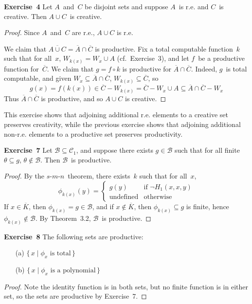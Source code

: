 \documentclass[letterpaper]{article}
\newcommand{\exercise}[2][]{\noindent\textbf{Exercise~{#2}}\ifthenelse{\isempty{#1}}{\textbf{.}}{ ({#1})\textbf{.}}}
\newcommand{\B}{\mathcal{B}}
\newcommand{\C}{\mathcal{C}}
\newcommand{\union}{\cup}
\newcommand{\sect}{\cap}
\newcommand{\smn}{$s$-$m$-$n$}
\theoremstyle{plain}
\theoremstyle{definition}
\theoremstyle{remark}
\begin{document}
\exercise{4}
Let $A$~and~$C$ be disjoint sets and suppose $A$~is r.e. and $C$~is creative. Then $A\union C$~is creative.
\begin{proof}
Since $A$~and~$C$ are r.e., $A\union C$ is r.e.

We claim that $\overline{A\union C}=\overline{A}\sect\overline{C}$ is productive. Fix a total computable function~$k$ such that for all~$x$, $W_{k(x)}=W_x\union A$ (cf.~Exercise~3), and let $f$~be a productive function for~$\overline{C}$. We claim that $g=f\circ k$ is productive for $\overline{A}\sect\overline{C}$. Indeed, $g$~is total computable, and given $W_x\subseteq\overline{A}\sect\overline{C}$, $W_{k(x)}\subseteq\overline{C}$, so
$$g(x)=f(k(x))\in\overline{C}-W_{k(x)}=\overline{C}-W_x\union A\subseteq\overline{A}\sect\overline{C}-W_x$$
Thus $\overline{A}\sect\overline{C}$ is productive, and so $A\union C$ is creative.
\end{proof}

\noindent This exercise shows that adjoining additional r.e. elements to a creative set preserves creativity, while the previous exercise shows that adjoining additional non-r.e. elements to a productive set preserves productivity.

\bigskip
\exercise{7}
Let $\B\subseteq\C_1$, and suppose there exists $g\in\B$ such that for all finite $\theta\subseteq g$, $\theta\not\in\B$. Then $\B$~is productive.
\begin{proof}
By the \smn\ theorem, there exists~$k$ such that for all~$x$,
$$\phi_{k(x)}(y)=\begin{cases}
g(y)&\text{if }\lnot H_1(x,x,y)\\
\text{undefined}&\text{otherwise}
\end{cases}$$
If $x\in\overline{K}$, then $\phi_{k(x)}=g\in\B$, and if $x\not\in\overline{K}$, then $\phi_{k(x)}\subseteq g$ is finite, hence $\phi_{k(x)}\not\in\B$. By Theorem~3.2, $\B$~is productive.
\end{proof}

\exercise{8}
The following sets are productive:
\begin{enumerate}[itemsep=0pt]
\item[(a)] $\{\,x\mid\phi_x\text{ is total}\,\}$
\item[(b)] $\{\,x\mid\phi_x\text{ is a polynomial}\,\}$
\end{enumerate}
\begin{proof}
Note the identity function is in both sets, but no finite function is in either set, so the sets are productive by Exercise~7.
\end{proof}
\end{document}
